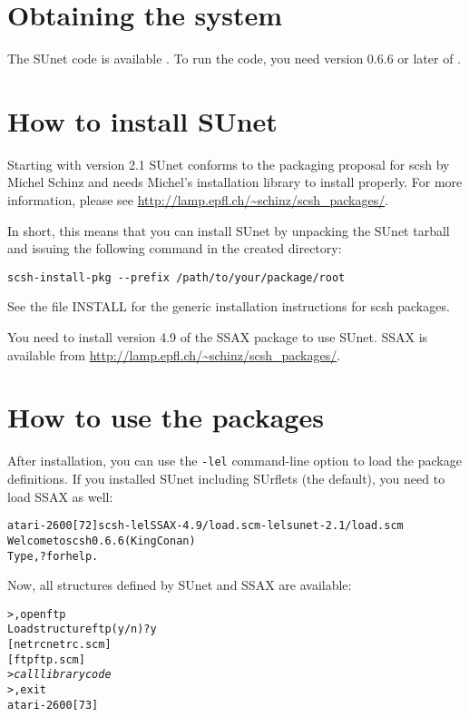 \section{Obtaining the system}

The SUnet code is available
.  To run the code, you need
version 0.6.6 or later of .

\section{How to install SUnet}

Starting with version 2.1 SUnet conforms to the packaging proposal for
scsh by Michel Schinz and needs Michel's installation library to
install properly. For more information, please see
\url{http://lamp.epfl.ch/~schinz/scsh_packages/}.

In short, this means that you can install SUnet by unpacking the SUnet
tarball and issuing the following command in the created directory:

\begin{verbatim}
scsh-install-pkg --prefix /path/to/your/package/root
\end{verbatim}

See the file INSTALL for the generic installation instructions for
scsh packages.  

You need to install version 4.9 of the SSAX package to use SUnet. SSAX
is available from \url{http://lamp.epfl.ch/~schinz/scsh_packages/}.

\section{How to use the packages}
%
After installation, you can use the \verb+-lel+ command-line option to
load the package definitions. If you installed SUnet including
SUrflets (the default), you need to load SSAX as well:
%
\begin{alltt}
atari-2600[72] scsh -lel SSAX-4.9/load.scm -lel sunet-2.1/load.scm
Welcome to scsh 0.6.6 (King Conan)
Type ,? for help.
\end{alltt}
%
Now, all structures defined by SUnet and SSAX are available:
%
\begin{alltt}
> ,open ftp
Load structure ftp (y/n)? y
[netrc netrc.scm]
[ftp ftp.scm]
> \textit{call library code}
> ,exit
atari-2600[73]
\end{alltt}

